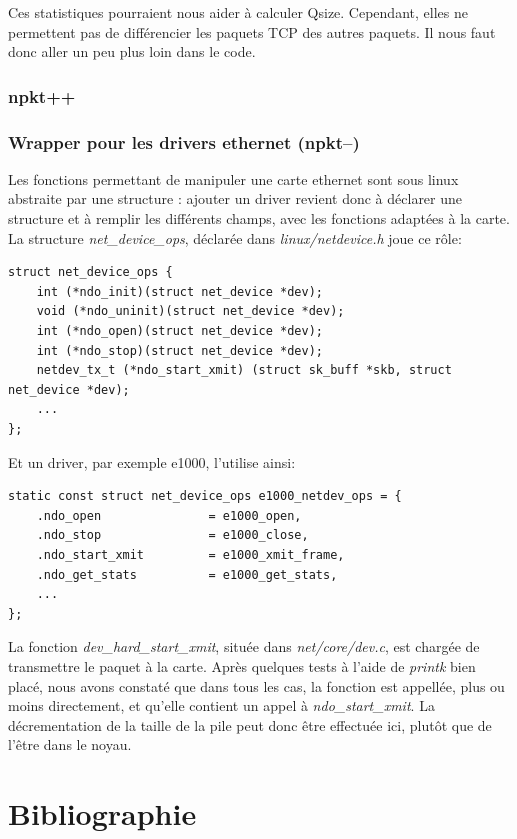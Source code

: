 \documentclass[a4paper]{article}
\begin{document}
Ces statistiques pourraient nous aider à calculer Qsize. Cependant,
elles ne permettent pas de différencier les paquets TCP des autres paquets.
Il nous faut donc aller un peu plus loin dans le code.

\subsubsection{npkt++}

\subsubsection{Wrapper pour les drivers ethernet (npkt--)}
Les fonctions permettant de manipuler une carte ethernet sont sous
linux abstraite par une structure : ajouter un driver revient donc
à déclarer une structure et à remplir les différents champs, avec
les fonctions adaptées à la carte.
La structure \textit{net\_device\_ops}, déclarée dans
\textit{linux/netdevice.h} joue ce rôle:
\begin{verbatim}
struct net_device_ops {
    int (*ndo_init)(struct net_device *dev);
    void (*ndo_uninit)(struct net_device *dev);
    int (*ndo_open)(struct net_device *dev);
    int (*ndo_stop)(struct net_device *dev);
    netdev_tx_t (*ndo_start_xmit) (struct sk_buff *skb, struct net_device *dev);
    ...
};
\end{verbatim}

Et un driver, par exemple e1000, l'utilise ainsi:
\begin{verbatim}
static const struct net_device_ops e1000_netdev_ops = {
    .ndo_open               = e1000_open,
    .ndo_stop               = e1000_close,
    .ndo_start_xmit         = e1000_xmit_frame,
    .ndo_get_stats          = e1000_get_stats,
    ...
};
\end{verbatim}

La fonction \textit{dev\_hard\_start\_xmit}, située dans
\textit{net/core/dev.c}, est chargée de transmettre le paquet
à la carte. Après quelques tests à l'aide de \textit{printk} bien
placé, nous avons constaté que dans tous les cas, la fonction
est appellée, plus ou moins directement, et qu'elle contient 
un appel à \textit{ndo\_start\_xmit}. La décrementation de la
taille de la pile peut donc être effectuée ici, plutôt que de
l'être dans le noyau.

\section{Bibliographie}
\end{document}
